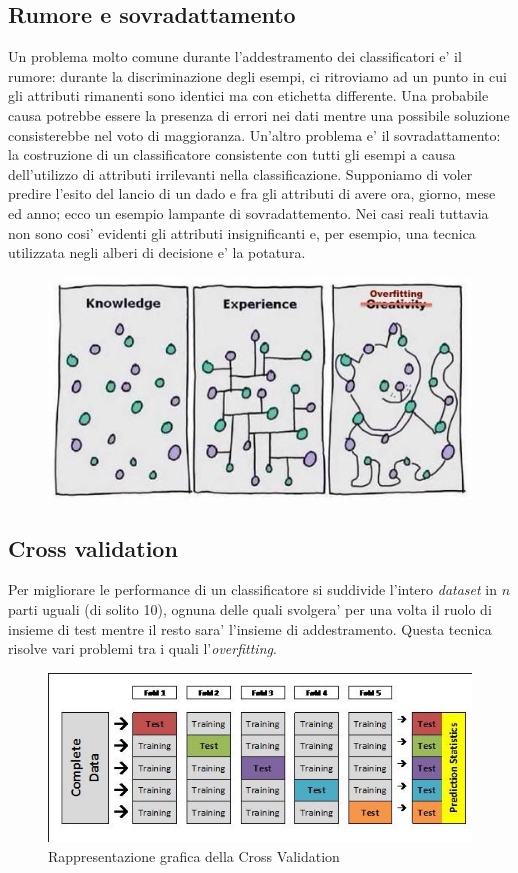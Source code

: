 \subsection*{Rumore e sovradattamento}
Un problema molto comune durante l'addestramento dei classificatori e' il rumore: durante la discriminazione degli esempi, ci ritroviamo ad un punto in cui gli attributi rimanenti sono identici ma con etichetta differente. Una probabile causa potrebbe essere la presenza di errori nei dati mentre una possibile soluzione consisterebbe nel voto di maggioranza.
Un'altro problema e' il sovradattamento: la costruzione di un classificatore consistente con tutti gli esempi a causa dell'utilizzo di attributi irrilevanti nella classificazione. Supponiamo di voler predire l'esito del lancio di un dado e fra gli attributi di avere ora, giorno, mese ed anno; ecco un esempio lampante di sovradattemento. Nei casi reali tuttavia non sono cosi' evidenti gli attributi insignificanti e, per esempio, una tecnica utilizzata  negli alberi di decisione e' la potatura.

\begin{figure}[H]
	\centering
	\includegraphics[width=0.7\linewidth]{img/overfitting}
	\caption{}
	\label{fig:overfitting}
\end{figure}


\subsection*{Cross validation}
Per migliorare le performance di un classificatore si suddivide l'intero \textit{dataset} in $n$ parti uguali (di solito 10), ognuna delle quali svolgera' per una volta il ruolo di insieme di test mentre il resto sara' l'insieme di addestramento. Questa tecnica risolve vari problemi tra i quali l'\textit{overfitting}.\\

\begin{figure}[H]
	\centering
	\includegraphics[width=0.7\linewidth]{img/crossvalidation}
	\caption{Rappresentazione grafica della Cross Validation}
	\label{fig:crossvalidation}
\end{figure}


